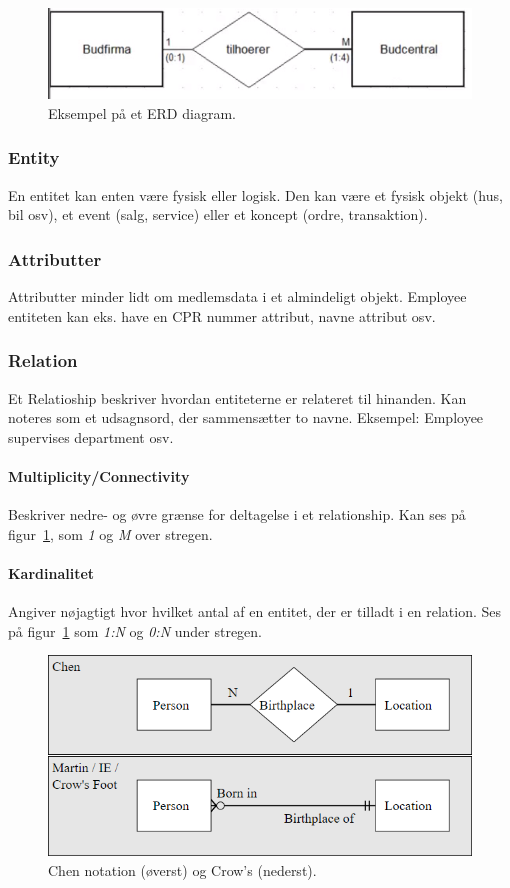 \begin{figure}[h]
	\centering
	\includegraphics[width=0.8\linewidth]{figs/spm1/entity_in_relation}
	\caption{Eksempel på et ERD diagram.}
	\label{fig:erd}
\end{figure}

\subsubsection{Entity}
En entitet kan enten være fysisk eller logisk. Den kan være et fysisk objekt  (hus, bil osv), et event (salg, service) eller et koncept (ordre, transaktion).

\subsubsection{Attributter}
Attributter minder lidt om medlemsdata i et almindeligt objekt. Employee entiteten kan eks. have en CPR nummer attribut, navne attribut osv.

\subsubsection{Relation}
Et Relatioship beskriver hvordan entiteterne er relateret til hinanden. Kan noteres som et udsagnsord, der sammensætter to navne. Eksempel: Employee supervises department osv.

\paragraph{Multiplicity/Connectivity}
Beskriver nedre- og øvre grænse for deltagelse i et relationship. Kan ses på figur~\ref{fig:erd}, som \textit{1} og \textit{M} over stregen.

\paragraph{Kardinalitet}
Angiver nøjagtigt hvor hvilket antal af en entitet, der er tilladt i en relation. Ses på figur~\ref{fig:erd} som \textit{1:N} og \textit{0:N} under stregen.

\begin{figure}[h]
	\centering
	\includegraphics[width=0.8\linewidth]{figs/spm1/notation}
	\caption{Chen notation (øverst) og Crow's (nederst).}
	\label{fig:notation}
\end{figure}

